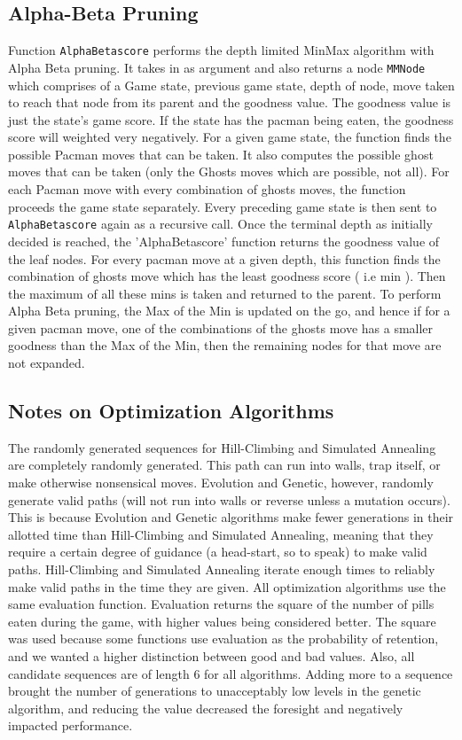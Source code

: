 \documentclass[a4paper]{article}
\begin{document}
\subsection{Alpha-Beta Pruning}
Function \texttt{AlphaBetascore} performs the depth limited MinMax algorithm with Alpha Beta pruning. It takes in as argument and also returns a node \texttt{MMNode} which comprises of a Game state, previous game state, depth of node, move taken to reach that node from its parent and the goodness value. The goodness value is just the state's game score. If the state has the pacman being eaten, the goodness score will weighted very negatively. For a given game state, the function finds the possible Pacman moves that can be taken. It also computes the possible ghost moves that can be taken (only the Ghosts moves which are possible, not all). For each Pacman move with every combination of ghosts moves, the function proceeds the game state separately. Every preceding game state is then sent to \texttt{AlphaBetascore} again as a recursive call. Once the terminal depth as initially decided is reached, the 'AlphaBetascore' function returns the goodness value of the leaf nodes. For every pacman move at a given depth, this function finds the combination of ghosts move which has the least goodness score ( i.e min ). Then the maximum of all these mins is taken and returned to the parent. 
To perform Alpha Beta pruning, the Max of the Min is updated on the go, and hence if for a given pacman move, one of the combinations of the ghosts move has a smaller goodness than the Max of the Min, then the remaining nodes for that move are not expanded. 

\subsection{Notes on Optimization Algorithms}
The randomly generated sequences for Hill-Climbing and Simulated Annealing are completely randomly generated.  This path can run into walls, trap itself, or make otherwise nonsensical moves.  Evolution and Genetic, however, randomly generate valid paths (will not run into walls or reverse unless a mutation occurs).  This is because Evolution and Genetic algorithms make fewer generations in their allotted time than Hill-Climbing and Simulated Annealing, meaning that they require a certain degree of guidance (a head-start, so to speak) to make valid paths.  Hill-Climbing and Simulated Annealing iterate enough times to reliably make valid paths in the time they are given.
\linebreak
All optimization algorithms use the same evaluation function.  Evaluation returns the square of the number of pills eaten during the game, with higher values being considered better.  The square was used because some functions use evaluation as the probability of retention, and we wanted a higher distinction between good and bad values.  Also, all candidate sequences are of length 6 for all algorithms.  Adding more to a sequence brought the number of generations to unacceptably low levels in the genetic algorithm, and reducing the value decreased the foresight and negatively impacted performance.
\end{document}
